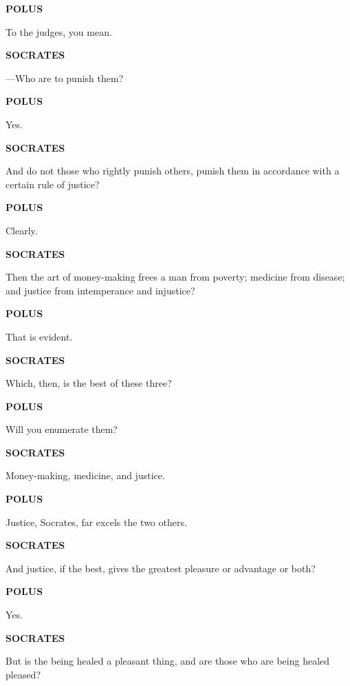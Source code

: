 \documentclass[11pt,letter]{article}
\begin{document}
\par \textbf{POLUS}
\par   To the judges, you mean.

\par \textbf{SOCRATES}
\par   —Who are to punish them?

\par \textbf{POLUS}
\par   Yes.

\par \textbf{SOCRATES}
\par   And do not those who rightly punish others, punish them in accordance with a certain rule of justice?

\par \textbf{POLUS}
\par   Clearly.

\par \textbf{SOCRATES}
\par   Then the art of money-making frees a man from poverty; medicine from disease; and justice from intemperance and injustice?

\par \textbf{POLUS}
\par   That is evident.

\par \textbf{SOCRATES}
\par   Which, then, is the best of these three?

\par \textbf{POLUS}
\par   Will you enumerate them?

\par \textbf{SOCRATES}
\par   Money-making, medicine, and justice.

\par \textbf{POLUS}
\par   Justice, Socrates, far excels the two others.

\par \textbf{SOCRATES}
\par   And justice, if the best, gives the greatest pleasure or advantage or both?

\par \textbf{POLUS}
\par   Yes.

\par \textbf{SOCRATES}
\par   But is the being healed a pleasant thing, and are those who are being healed pleased?
\end{document}
